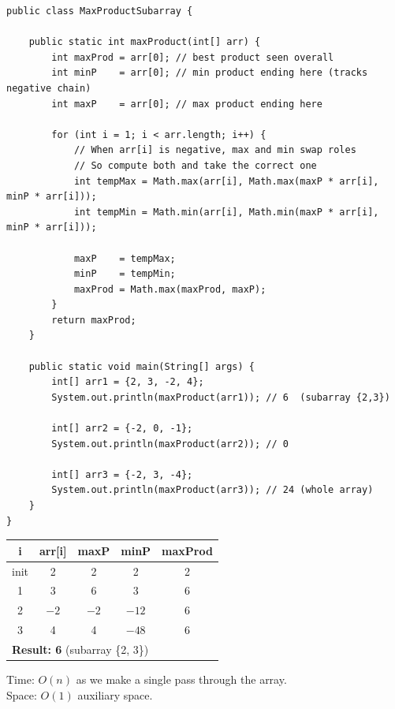 \documentclass[12pt,a4paper,oneside]{book}
\begin{document}
\begin{lstlisting}[caption={Maximum Product Subarray --- Optimal Dynamic Programming, O(n) time O(1) space}]
public class MaxProductSubarray {

    public static int maxProduct(int[] arr) {
        int maxProd = arr[0]; // best product seen overall
        int minP    = arr[0]; // min product ending here (tracks negative chain)
        int maxP    = arr[0]; // max product ending here

        for (int i = 1; i < arr.length; i++) {
            // When arr[i] is negative, max and min swap roles
            // So compute both and take the correct one
            int tempMax = Math.max(arr[i], Math.max(maxP * arr[i], minP * arr[i]));
            int tempMin = Math.min(arr[i], Math.min(maxP * arr[i], minP * arr[i]));

            maxP    = tempMax;
            minP    = tempMin;
            maxProd = Math.max(maxProd, maxP);
        }
        return maxProd;
    }

    public static void main(String[] args) {
        int[] arr1 = {2, 3, -2, 4};
        System.out.println(maxProduct(arr1)); // 6  (subarray {2,3})

        int[] arr2 = {-2, 0, -1};
        System.out.println(maxProduct(arr2)); // 0

        int[] arr3 = {-2, 3, -4};
        System.out.println(maxProduct(arr3)); // 24 (whole array)
    }
}
\end{lstlisting}

\begin{dryrun}[arr = \{2, 3, $-$2, 4\}]
\begin{center}
\begin{tabular}{ccccc}
\toprule
\textbf{i} & \textbf{arr[i]} & \textbf{maxP} & \textbf{minP} & \textbf{maxProd}\\
\midrule
init & 2  & 2   & 2    & 2\\
1    & 3  & 6   & 3    & 6\\
2    & $-2$ & $-2$ & $-12$ & 6\\
3    & 4  & 4   & $-48$ & 6\\
\midrule
\multicolumn{5}{l}{\textbf{Result: 6} (subarray \{2, 3\})}\\
\bottomrule
\end{tabular}
\end{center}
\end{dryrun}

\begin{complexity}
Time: $O(n)$ as we make a single pass through the array.\\
Space: $O(1)$ auxiliary space.
\end{complexity}
\end{document}
